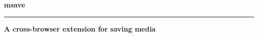 
\begin{titlepage}
    \begin{center}
        
        {\Huge \textbf{msave}}
  
        \normalsize
        \vspace{0.5 cm}

        \vspace{0.5cm}
        \begin{centering}
        \hrule
        \vspace{.2cm}
         \LARGE \textbf{A cross-browser extension for saving media}\\

        \end{centering}
        \vspace{1cm}
        

    \end{center}
  \end{titlepage}
  
  
  \newpage
  \tableofcontents
  \newpage
  
  \AddEverypageHook{\Lpagenumber}%
  
  